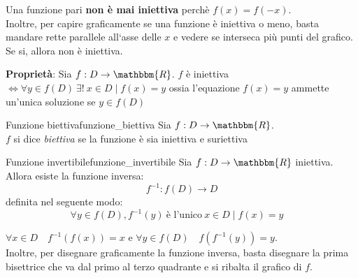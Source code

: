 \documentclass[12pt]{report}
\newcounter{definition}
\newcommand{\nmu}{}
\begin{document}
	\begin{note}{}{}
		Una funzione pari \textbf{non è mai iniettiva} perchè $f(x) = f(-x)$.  \\
		Inoltre, per capire graficamente se una funzione è iniettiva o meno, basta mandare rette parallele all`asse delle $x$ e vedere se interseca più punti del grafico. Se si, allora non è iniettiva.
	\end{note}
	\textbf{Proprietà}: Sia $f: D \to \mathbbm{R}$. $f$ è iniettiva $\iff \forall y \in f(D) \ \exists !\ x \in D \mid f(x) = y$ ossia l'equazione $f(x) = y$ ammette un'unica soluzione se $y \in f(D)$
	\begin{definition}{\nmu Funzione biettiva}{funzione_biettiva}
		Sia $f: D \to \mathbbm{R}$. \\
		$f$ si dice \textit{biettiva} se la funzione è sia iniettiva e suriettiva
	\end{definition}
	\begin{definition}{Funzione invertibile}{funzione_invertibile}
		Sia $f: D \to \mathbbm{R}$ iniettiva. \\
		Allora esiste la funzione inversa:
		\[
		f^{-1}: f(D) \to D
		\]
		definita nel seguente modo:
		\[
		\forall y \in f(D), f^{-1}(y)\ \text{è l'unico}\ x \in D \mid f(x) = y \quad
		\]
	\end{definition}
	\begin{note}{}{}
		$\forall x \in D \quad f^{-1}(f(x)) = x$ e $\forall y \in f(D) \quad f(f^{-1}(y)) = y$. \\
		Inoltre, per disegnare graficamente la funzione inversa, basta disegnare la prima bisettrice che va dal primo al terzo quadrante e si ribalta il grafico di $f$.
	\end{note}
\end{document}

